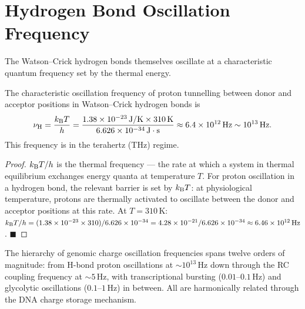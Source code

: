 \section{Hydrogen Bond Oscillation Frequency}
\label{sec:hbond_oscillations}

The Watson--Crick hydrogen bonds themselves oscillate at a characteristic
quantum frequency set by the thermal energy.

\begin{proposition}
\label{prop:hbond_freq}
The characteristic oscillation frequency of proton tunnelling between
donor and acceptor positions in Watson--Crick hydrogen bonds is
\begin{equation}
  \nu_{\mathrm{H}} = \frac{k_{\mathrm{B}} T}{h}
    = \frac{1.38\times 10^{-23}\,\mathrm{J/K} \times 310\,\mathrm{K}}
           {6.626\times 10^{-34}\,\mathrm{J\cdot s}}
    \approx 6.4\times 10^{12}\,\mathrm{Hz} \sim 10^{13}\,\mathrm{Hz}.
  \label{eq:nu_H}
\end{equation}
This frequency is in the terahertz (THz) regime.
\end{proposition}

\begin{proof}
$k_{\mathrm{B}} T / h$ is the thermal frequency --- the rate at which a system in
thermal equilibrium exchanges energy quanta at temperature $T$. For
proton oscillation in a hydrogen bond, the relevant barrier is set by
$k_{\mathrm{B}} T$: at physiological temperature, protons are thermally activated
to oscillate between the donor and acceptor positions at this rate.
At $T = 310\,\mathrm{K}$: $k_{\mathrm{B}} T / h = (1.38\times 10^{-23} \times 310)
/ 6.626\times 10^{-34} = 4.28\times 10^{-21} / 6.626\times 10^{-34}
\approx 6.46\times 10^{12}\,\mathrm{Hz}$. $\blacksquare$
\end{proof}

\begin{remark}
The hierarchy of genomic charge oscillation frequencies spans twelve
orders of magnitude: from H-bond proton oscillations at $\sim 10^{13}\,\mathrm{Hz}$
down through the RC coupling frequency at $\sim 5\,\mathrm{Hz}$,
with transcriptional bursting ($0.01$--$0.1\,\mathrm{Hz}$) and
glycolytic oscillations ($0.1$--$1\,\mathrm{Hz}$) in between. All
are harmonically related through the DNA charge storage mechanism.
\end{remark}

